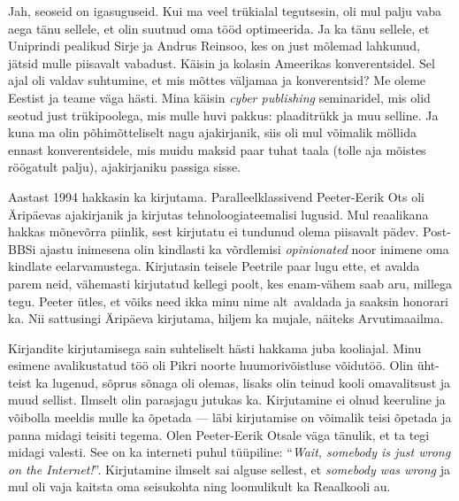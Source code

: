 
Jah, seoseid on igasuguseid. Kui ma veel trükialal tegutsesin, oli mul palju vaba aega tänu sellele, et olin suutnud oma 
tööd optimeerida. Ja ka tänu sellele, et Uniprindi pealikud Sirje ja Andrus 
Reinsoo, kes on just 
mõlemad lahkunud, jätsid 
mulle piisavalt vabadust. Käisin ja kolasin Ameerikas 
konverentsidel. Sel ajal oli valdav suhtumine, et mis 
mõttes väljamaa ja konverentsid? Me oleme Eestist ja teame väga hästi. Mina 
käisin \emph{cyber publishing} seminaridel, mis olid 
seotud just trükipoolega, mis mulle huvi pakkus: plaaditrükk ja 
muu selline. Ja kuna ma olin põhimõtteliselt nagu ajakirjanik, siis oli
mul võimalik möllida ennast konverentsidele, mis muidu maksid 
paar tuhat taala (tolle aja mõistes röögatult palju), 
ajakirjaniku passiga sisse. 

Aastast 1994 hakkasin ka kirjutama. Paralleelklassivend Peeter-Eerik 
Ots oli Äripäevas ajakirjanik ja kirjutas 
tehnoloogiateemalisi lugusid. Mul reaalikana hakkas 
mõnevõrra piinlik, sest kirjutatu ei tundunud olema piisavalt pädev. Post-BBSi ajastu inimesena olin kindlasti ka võrdlemisi 
\emph{opinionated} noor inimene oma kindlate 
eelarvamustega. Kirjutasin teisele Peetrile paar lugu ette, et avalda parem 
neid, vähemasti kirjutatud kellegi poolt, kes enam-vähem saab aru, millega 
tegu. Peeter ütles, et võiks need ikka minu nime 
alt avaldada ja saaksin honorari ka. Nii sattusingi Äripäeva 
kirjutama, hiljem ka mujale, näiteks
Arvutimaailma. 


Kirjandite kirjutamisega sain suhteliselt hästi hakkama juba kooliajal. Minu 
esimene avalikustatud töö oli Pikri noorte 
huumorivõistluse võidutöö. Olin üht-teist ka lugenud, sõprus 
sõnaga oli olemas, lisaks olin teinud kooli omavalitsust ja muud 
sellist. Ilmselt olin parasjagu jutukas ka. Kirjutamine ei 
olnud keeruline ja võibolla meeldis mulle ka õpetada --- läbi kirjutamise on 
võimalik teisi õpetada ja panna midagi teisiti tegema. Olen Peeter-Eerik Otsale väga tänulik, et 
ta tegi midagi valesti. See on ka interneti puhul tüüpiline: 
\enquote{\emph{Wait, somebody is just wrong on the Internet!}}. Kirjutamine 
ilmselt sai alguse sellest, et \emph{somebody was wrong} ja mul oli vaja 
kaitsta oma seisukohta ning loomulikult ka Reaalkooli au. 

